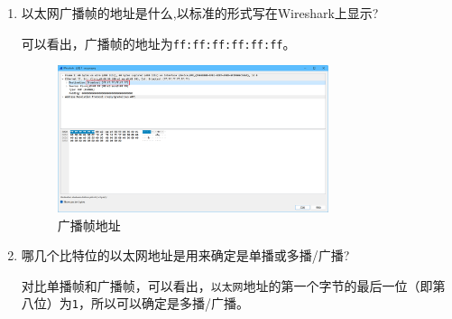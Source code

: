 \documentclass{article}
\begin{document}
\begin{enumerate}[noitemsep]
  \item 以太网广播帧的地址是什么,以标准的形式写在Wireshark上显示?

        可以看出，广播帧的地址为\texttt{ff:ff:ff:ff:ff:ff}。

        \begin{figure}[H]
          \centering
          \includegraphics[width=0.75\textwidth]{images/14.png}
          \caption{广播帧地址}
        \end{figure}

  \item 哪几个比特位的以太网地址是用来确定是单播或多播/广播?

        对比单播帧和广播帧，可以看出，\texttt{以太网}地址的第一个字节的最后一位（即第八位）为\texttt{1}，所以可以确定是多播/广播。


\end{enumerate}
\end{document}

